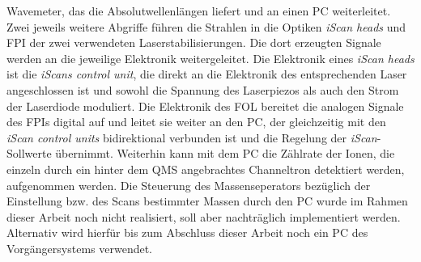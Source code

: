 Wavemeter, das die Absolutwellenlängen liefert und an einen PC weiterleitet.
Zwei jeweils weitere Abgriffe führen die Strahlen in die Optiken \textit{iScan
heads} und FPI der zwei verwendeten Laserstabilisierungen. Die dort erzeugten
Signale werden an die jeweilige Elektronik weitergeleitet. Die Elektronik eines
\textit{iScan heads} ist die \textit{iScans control unit}, die direkt an die
Elektronik des entsprechenden Laser angeschlossen ist und sowohl die Spannung
des Laserpiezos als auch den Strom der Laserdiode moduliert. Die Elektronik des
FOL bereitet die analogen Signale des FPIs digital auf und leitet sie weiter an
den PC, der gleichzeitig mit den \textit{iScan control units} bidirektional
verbunden ist und die Regelung der \textit{iScan}-Sollwerte übernimmt. Weiterhin
kann mit dem PC die Zählrate der Ionen, die einzeln durch ein hinter dem QMS
angebrachtes Channeltron detektiert werden, aufgenommen werden. Die Steuerung
des Massenseperators bezüglich der Einstellung bzw. des Scans bestimmter Massen
durch den PC wurde im Rahmen dieser Arbeit noch nicht realisiert, soll aber
nachträglich implementiert werden. Alternativ wird hierfür bis zum Abschluss
dieser Arbeit noch ein PC des Vorgängersystems verwendet.

